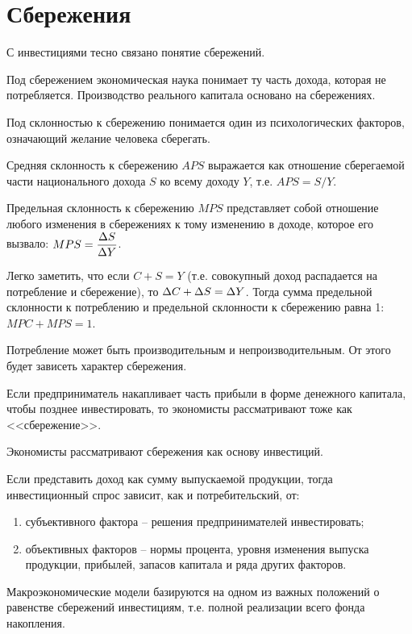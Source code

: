 \vspace*{2em}
\section{Сбережения}

С инвестициями тесно связано понятие сбережений.

Под сбережением экономическая наука понимает ту часть дохода, которая не
потребляется. Производство реального капитала основано на сбережениях.

Под склонностью к сбережению понимается один из психологических факторов,
означающий желание человека сберегать.

Средняя склонность к сбережению \( APS \) выражается как отношение сберегаемой
части национального дохода \( S \) ко всему доходу \( Y \), т.е. \( APS = S/Y \).
 
Предельная склонность к сбережению \( MPS \) представляет собой отношение
любого изменения в сбережениях к тому изменению в доходе, которое его вызвало:
\( MPS = \displaystyle \frac{\Delta S}{\Delta Y} \).
 
Легко заметить, что если \( C + S = Y \) (т.е. совокупный доход распадается на
потребление и сбережение), то \( \Delta C + \Delta S = \Delta Y \). Тогда сумма
предельной склонности к потреблению и предельной склонности к сбережению равна
1: \( MPC + MPS = 1 \).
 
Потребление может быть производительным и непроизводительным. От этого будет
зависеть характер сбережения.

Если предприниматель накапливает часть прибыли в форме денежного капитала,
чтобы позднее инвестировать, то экономисты рассматривают тоже как
<<сбережение>>.

Экономисты рассматривают сбережения как основу инвестиций.

Если представить доход как сумму выпускаемой продукции, тогда инвестиционный
спрос зависит, как и потребительский, от:
\begin{enumerate}
    \item субъективного фактора -- решения предпринимателей инвестировать;
    \item объективных факторов -- нормы процента, уровня изменения выпуска
    продукции, прибылей, запасов капитала и ряда других факторов.
\end{enumerate}

Макроэкономические модели базируются на одном из важных положений о равенстве
сбережений инвестициям, т.е. полной реализации всего фонда накопления.

